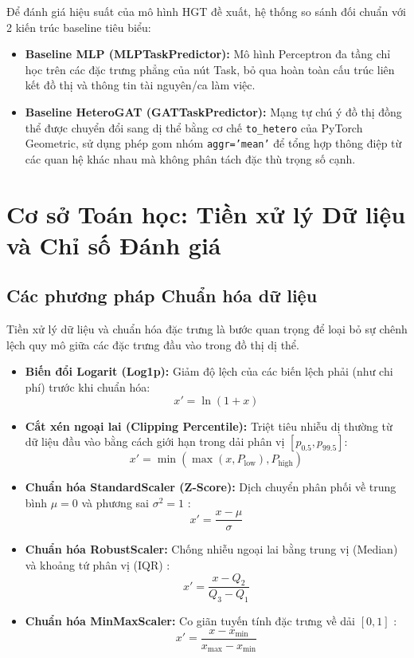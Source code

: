 Để đánh giá hiệu suất của mô hình HGT đề xuất, hệ thống so sánh đối chuẩn với 2 kiến trúc baseline tiêu biểu:
\begin{itemize}
    \item \textbf{Baseline MLP (MLPTaskPredictor):} Mô hình Perceptron đa tầng chỉ học trên các đặc trưng phẳng của nút Task, bỏ qua hoàn toàn cấu trúc liên kết đồ thị và thông tin tài nguyên/ca làm việc.
    \item \textbf{Baseline HeteroGAT (GATTaskPredictor):} Mạng tự chú ý đồ thị đồng thể được chuyển đổi sang dị thể bằng cơ chế \texttt{to\_hetero} của PyTorch Geometric, sử dụng phép gom nhóm \texttt{aggr='mean'} để tổng hợp thông điệp từ các quan hệ khác nhau mà không phân tách đặc thù trọng số cạnh.
\end{itemize}

\section{Cơ sở Toán học: Tiền xử lý Dữ liệu và Chỉ số Đánh giá}
\subsection{Các phương pháp Chuẩn hóa dữ liệu}
Tiền xử lý dữ liệu và chuẩn hóa đặc trưng \cite{han2011data, bishop2006pattern, goodfellow2016, pedregosa2011sklearn} là bước quan trọng để loại bỏ sự chênh lệch quy mô giữa các đặc trưng đầu vào trong đồ thị dị thể.
\begin{itemize}
    \item \textbf{Biến đổi Logarit (Log1p):} Giảm độ lệch của các biến lệch phải (như chi phí) trước khi chuẩn hóa:
    \begin{equation}
        x' = \ln(1 + x)
    \end{equation}
    \item \textbf{Cắt xén ngoại lai (Clipping Percentile):} Triệt tiêu nhiễu dị thường từ dữ liệu đầu vào bằng cách giới hạn trong dải phân vị $[p_{0.5}, p_{99.5}]$:
    \begin{equation}
        x' = \min\left(\max(x, P_{\text{low}}), P_{\text{high}}\right)
    \end{equation}
    \item \textbf{Chuẩn hóa StandardScaler (Z-Score):} Dịch chuyển phân phối về trung bình $\mu = 0$ và phương sai $\sigma^2 = 1$ \cite{han2011data}:
    \begin{equation}
        x' = \frac{x - \mu}{\sigma}
    \end{equation}
    \item \textbf{Chuẩn hóa RobustScaler:} Chống nhiễu ngoại lai bằng trung vị (Median) và khoảng tứ phân vị (IQR) \cite{pedregosa2011sklearn}:
    \begin{equation}
        x' = \frac{x - Q_2}{Q_3 - Q_1}
    \end{equation}
    \item \textbf{Chuẩn hóa MinMaxScaler:} Co giãn tuyến tính đặc trưng về dải $[0, 1]$ \cite{han2011data}:
    \begin{equation}
        x' = \frac{x - x_{\min}}{x_{\max} - x_{\min}}
    \end{equation}
\end{itemize}

